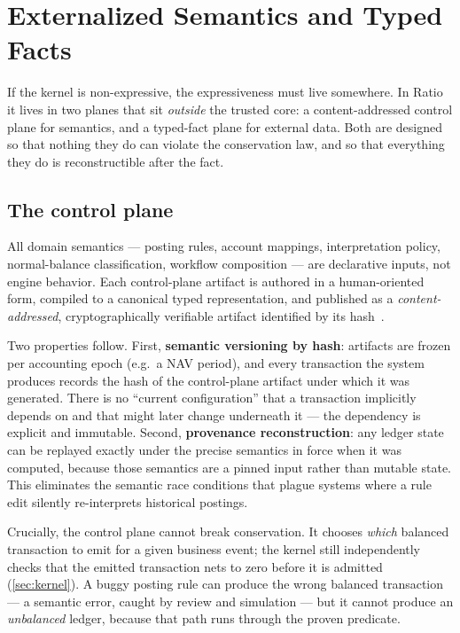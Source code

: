 \section{Externalized Semantics and Typed Facts}
\label{sec:control}

If the kernel is non-expressive, the expressiveness must live somewhere.
In Ratio it lives in two planes that sit \emph{outside} the trusted core:
a content-addressed control plane for semantics, and a typed-fact plane
for external data. Both are designed so that nothing they do can violate
the conservation law, and so that everything they do is reconstructible
after the fact.

\subsection{The control plane}

All domain semantics --- posting rules, account mappings, interpretation
policy, normal-balance classification, workflow composition --- are
declarative inputs, not engine behavior. Each control-plane artifact is
authored in a human-oriented form, compiled to a canonical typed
representation, and published as a \emph{content-addressed},
cryptographically verifiable artifact identified by its
hash~\cite{merkle1987digital}.

Two properties follow. First, \textbf{semantic versioning by hash}:
artifacts are frozen per accounting epoch (e.g.\ a NAV period), and every
transaction the system produces records the hash of the control-plane
artifact under which it was generated. There is no ``current
configuration'' that a transaction implicitly depends on and that might
later change underneath it --- the dependency is explicit and immutable.
Second, \textbf{provenance reconstruction}: any ledger state can be
replayed exactly under the precise semantics in force when it was
computed, because those semantics are a pinned input rather than mutable
state. This eliminates the semantic race conditions that plague systems
where a rule edit silently re-interprets historical postings.

Crucially, the control plane cannot break conservation. It chooses
\emph{which} balanced transaction to emit for a given business event;
the kernel still independently checks that the emitted transaction nets
to zero before it is admitted (\cref{sec:kernel}). A buggy posting rule
can produce the wrong balanced transaction --- a semantic error, caught
by review and simulation --- but it cannot produce an \emph{unbalanced}
ledger, because that path runs through the proven predicate.

